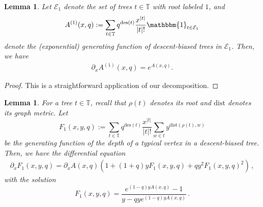 \documentclass{article}
\newtheorem{lemma}[theorem]{Lemma}
\theoremstyle{remark}
\newcommand{\bT}{\mathbb{T}}
\newcommand{\abs}[1]{{\left|#1\right|}}
\newcommand{\dist}{\mathrm{dist}}
\newcommand{\cE}{\mathcal{E}}
\newcommand{\One}[1]{\mathbbm{1}_{#1}}
\newcommand{\des}[1]{{\mathrm{des}{\left(#1\right)}}}
\begin{document}
\begin{lemma}
\label{lem:trees with smallest root}
    Let $\cE_{1}$ denote the set of trees $t \in \bT$ with root labeled $1$, and
    \begin{align*}
        A^{(1)}(x,q) := \sum_{t\in \bT} q^\des{t} \frac{x^{|t|}}{|t|!}  \One{t \in \cE_1}
    \end{align*}
    denote the (exponential) generating function of descent-biased trees in $\cE_1$.
    Then, we have
    \begin{align*}
        \partial_x A^{(1)}(x,q) = e^{A(x,q)}. 
    \end{align*}
\end{lemma}

\begin{proof}
    This is a straightforward application of our decomposition.
\end{proof}

\begin{lemma}
\label{lem: generating function typical depth}
    For a tree $t\in \bT$, recall that $\rho(t)$ denotes its root and $\dist$ denotes its graph metric. Let
    \begin{equation*}
        F_1(x,y,q) := \sum_{t\in\bT} q^\des{t} \frac{x^\abs{t}}{\abs{t}!} \sum_{w\in t} y^{\dist(\rho(t), w)}
    \end{equation*}
    be the generating function of the depth of a typical vertex in a descent-biased tree.
    Then, we have the differential equation
    \begin{align}\label{eq: equadiff on F1}
        \partial_x F_1(x,y,q) 
        = \partial_x A(x,q) \left(
        1 + (1+q)y F_1(x,y,q) + qy^2 F_1(x,y,q)^2 
        \right) \,,
    \end{align}
    with the solution
    \begin{equation}\label{eq: explicit formula for generating function of typical depth}
        F_1(x,y,q) = \frac{ e^{(1-q)yA(x,q)} - 1 }{ y - qye^{(1-q)yA(x,q)} } \,.
    \end{equation}
\end{lemma}
\end{document}
